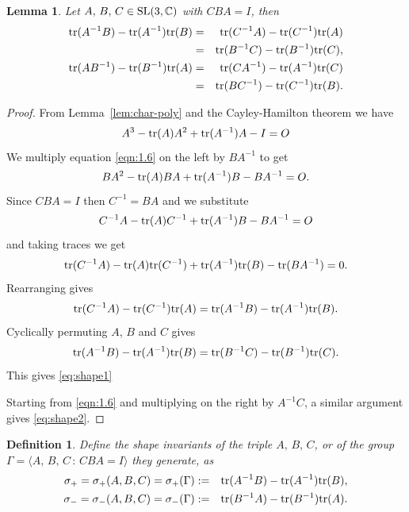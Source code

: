 \documentclass[11pt]{amsart}
\newtheorem{lemma}[theorem]{Lemma}
\newtheorem{definition}[theorem]{Definition}
\numberwithin{equation}{section}
\begin{document}
\begin{lemma}\label{Lem2.5}
	Let $A,\,B,\,C\in {\rm SL}(3,\mathbb{C})$ with $CBA=I$, then
	\begin{eqnarray}
		{\rm tr}(A^{-1}B)-{\rm tr}(A^{-1}){\rm tr}(B) 
		& = & {\rm tr}(C^{-1}A)-{\rm tr}(C^{-1}){\rm tr}(A) \label{eq:shape1}\\
		& = & {\rm tr}(B^{-1}C)-{\rm tr}(B^{-1}){\rm tr}(C), \nonumber \\
				{\rm tr}(AB^{-1})-{\rm tr}(B^{-1}){\rm tr}(A) 
		& = & {\rm tr}(CA^{-1})-{\rm tr}(A^{-1}){\rm tr}(C) \label{eq:shape2}\\
		& = & {\rm tr}(BC^{-1})-{\rm tr}(C^{-1}){\rm tr}(B). \nonumber
	\end{eqnarray}
\end{lemma}
\begin{proof}
From Lemma~\ref{lem:char-poly} and the Cayley-Hamilton theorem we have 
\begin{equation}\label{eqn:1.6}
	A^3-{\rm tr}(A)A^2+{\rm tr}(A^{-1})A-I=O
\end{equation}
	We multiply equation \eqref{eqn:1.6} on the left by $BA^{-1}$ to get
	\begin{equation*}
		BA^2-{\rm tr}(A)BA+{\rm tr}(A^{-1})B-BA^{-1}=O.
	\end{equation*}
Since $CBA=I$ then $C^{-1}=BA$ and we substitute
\begin{equation*}
	C^{-1}A-{\rm tr}(A)C^{-1}+{\rm tr}(A^{-1})B-BA^{-1}=O
\end{equation*}
and taking traces we get
\begin{equation*}
	{\rm tr}(C^{-1}A)-{\rm tr}(A){\rm tr}(C^{-1})+{\rm tr}(A^{-1}){\rm tr}(B)-{\rm tr}(BA^{-1})=0.
\end{equation*}
Rearranging gives
$$
{\rm tr}(C^{-1}A)-{\rm tr}(C^{-1}){\rm tr}(A)={\rm tr}(A^{-1}B)-{\rm tr}(A^{-1}){\rm tr}(B).
$$
Cyclically permuting $A$, $B$ and $C$ gives
$$
{\rm tr}(A^{-1}B)-{\rm tr}(A^{-1}){\rm tr}(B)={\rm tr}(B^{-1}C)-{\rm tr}(B^{-1}){\rm tr}(C). 
$$
This gives \eqref{eq:shape1}

Starting from \eqref{eqn:1.6} and multiplying on the right by $A^{-1}C$, a similar argument gives
\eqref{eq:shape2}.
\end{proof}

\medskip

\begin{definition}\label{def-shape-invariants}
Define the {\em shape invariants} of the triple $A,\,B,\,C$, or of the group 
$\Gamma=\langle A,\,B,\,C\,:\, CBA=I\rangle$ they generate, as
\begin{eqnarray}
\sigma_+=\sigma_+(A,B,C)=\sigma_+(\Gamma) &:= & {\rm tr}(A^{-1}B)-{\rm tr}(A^{-1}){\rm tr}(B), \label{eq:shape+} \\
\sigma_-=\sigma_-(A,B,C)=\sigma_-(\Gamma) &:= &{\rm tr}(B^{-1}A)-{\rm tr}(B^{-1}){\rm tr}(A). \label{eq:shape-}
\end{eqnarray}	
\end{definition}
	
\end{document}
